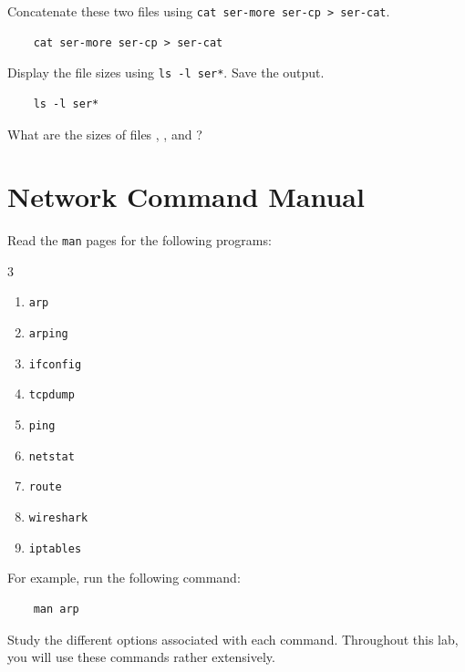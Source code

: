 \documentclass{UTNetLab}
\begin{document}
Concatenate these two files using \lstinline{cat ser-more ser-cp > ser-cat}.

\begin{lstlisting}
	cat ser-more ser-cp > ser-cat
\end{lstlisting}

Display the file sizes using \lstinline{ls -l ser*}.
Save the output.

\begin{lstlisting}
	ls -l ser*
\end{lstlisting}

\begin{report}
    \item What are the sizes of files , , and ?
\end{report}

\section{Network Command Manual}
Read the \lstinline{man} pages for the following programs:
\begin{multicols}{3}
    \begin{enumerate}
        \item \lstinline{arp}
        \item \lstinline{arping}
        \item \lstinline{ifconfig}
        \item \lstinline{tcpdump}
        \item \lstinline{ping}
        \item \lstinline{netstat}
        \item \lstinline{route}
        \item \lstinline{wireshark}
        \item \lstinline{iptables}
    \end{enumerate}
\end{multicols}

For example,  run the following command:

\begin{lstlisting}
	man arp
\end{lstlisting}

Study the different options associated with each command.
Throughout this lab, you will use these commands rather extensively.
\end{document}
